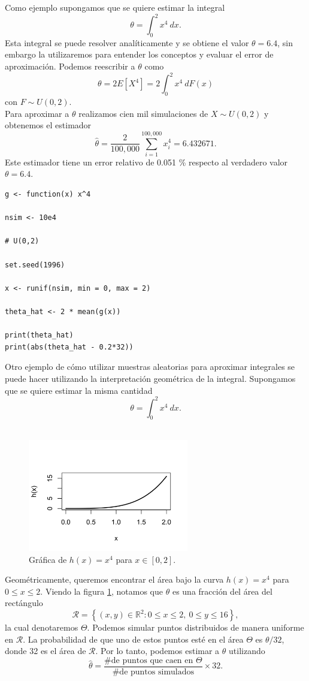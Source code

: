 \documentclass[11pt,a4paper]{article}
\begin{document}
Como ejemplo supongamos que se quiere estimar la integral $$\theta = \int_0^2 x^4 \ dx.$$ Esta integral se puede resolver analíticamente y se obtiene el valor $\theta = 6.4$, sin embargo la utilizaremos para entender los conceptos y evaluar el error de aproximación. Podemos reescribir a $\theta$ como $$\theta = 2E[X^4] =  2\int_0^2 x^4 \ dF(x)$$ con $F\sim U(0,2).$\\

Para aproximar a $\theta$ realizamos cien mil simulaciones de $X\sim U(0,2)$ y obtenemos el estimador $$\hat{\theta} = \frac{2}{100,000}\sum_{i=1}^{100,000} x_i^4 = 6.432671.$$ Este estimador tiene un error relativo de 0.051 \% respecto al verdadero valor $\theta = 6.4$.\\

\begin{lstlisting}
g <- function(x) x^4

nsim <- 10e4

# U(0,2)

set.seed(1996)

x <- runif(nsim, min = 0, max = 2)

theta_hat <- 2 * mean(g(x))

print(theta_hat)
print(abs(theta_hat - 0.2*32))
\end{lstlisting}

Otro ejemplo de cómo utilizar muestras aleatorias para aproximar integrales se puede hacer utilizando la interpretación geométrica de la integral. Supongamos que se quiere estimar la misma cantidad $$\theta = \int_0^2 x^4 \ dx.$$\\

\begin{figure}
\centering\includegraphics[width=7cm]{hx.png}
\caption{Gráfica de $h(x) = x^4$ para $x\in [0,2]$.}
\label{fig:hx}
\end{figure}

Geométricamente, queremos encontrar el área bajo la curva $h(x) = x^4$ para $0 \leq x \leq 2$. Viendo la figura \ref{fig:hx}, notamos que $\theta$ es una fracción del área del rectángulo $$\mathcal{R} = \left\lbrace (x, y) \in \mathbb{R}^2: 0\leq x \leq 2, \ 0 \leq y \leq 16\right \rbrace,$$ la cual denotaremos $\Theta$. Podemos simular puntos distribuidos de manera uniforme en $\mathcal{R}$. La probabilidad de que uno de estos puntos esté en el área $\Theta$ es $\theta / 32$, donde 32 es el área de $\mathcal{R}.$ Por lo tanto, podemos estimar a $\theta$ utilizando $$\hat{\theta} = \frac{\text{\# de puntos que caen en }\Theta}{\text{\# de puntos simulados}} \times 32.$$
\end{document}
